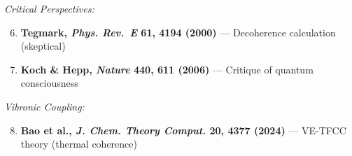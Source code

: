 \textit{Critical Perspectives:}
\begin{enumerate}
\setcounter{enumi}{5}
\item \textbf{Tegmark, \emph{Phys. Rev.~E} 61, 4194 (2000)} --- Decoherence calculation (skeptical)
\item \textbf{Koch \& Hepp, \emph{Nature} 440, 611 (2006)} --- Critique of quantum consciousness
\end{enumerate}

\textit{Vibronic Coupling:}
\begin{enumerate}
\setcounter{enumi}{7}
\item \textbf{Bao et al., \emph{J. Chem. Theory Comput.} 20, 4377 (2024)} --- VE-TFCC theory (thermal coherence)
\end{enumerate}
